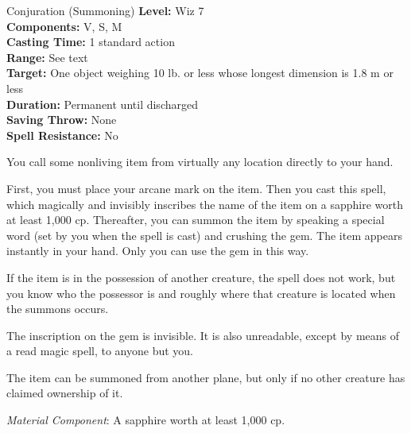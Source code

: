 
{Conjuration (Summoning)}
{
	\textbf{Level:}
	Wiz 7\\
	\textbf{Components:}
	V, S, M\\
	\textbf{Casting Time:}
	1 standard action\\
	\textbf{Range:}
	See text\\
	\textbf{Target:}
	One object weighing 10 lb. or less whose longest dimension is 1.8 m or less\\
	\textbf{Duration:}
	Permanent until discharged\\
	\textbf{Saving Throw:}
	None\\
	\textbf{Spell Resistance:}
	No\\
}
{
	You call some nonliving item from virtually any location directly to your hand.

	First, you must place your arcane mark on the item. Then you cast this spell, which magically and invisibly inscribes the name of the item on a sapphire worth at least 1,000 cp. Thereafter, you can summon the item by speaking a special word (set by you when the spell is cast) and crushing the gem. The item appears instantly in your hand. Only you can use the gem in this way.

	If the item is in the possession of another creature, the spell does not work, but you know who the possessor is and roughly where that creature is located when the summons occurs.

	The inscription on the gem is invisible. It is also unreadable, except by means of a read magic spell, to anyone but you.

	The item can be summoned from another plane, but only if no other creature has claimed ownership of it.

	\textit{Material Component}:
	A sapphire worth at least 1,000 cp.

}
